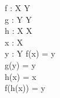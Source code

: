 \documentclass[a4paper,10pt,fleqn]{article}
\begin{document}
\begin{zed}
[X, Y]
\end{zed}

\begin{axdef}
f : X \fun Y \\
g : Y \fun Y \\
h : X \fun X \\
x : X \\
y : Y
\where
f(x) = y \\
g(y) = y \\
h(x) = x \\
f(h(x)) = y
\end{axdef}
\end{document}

